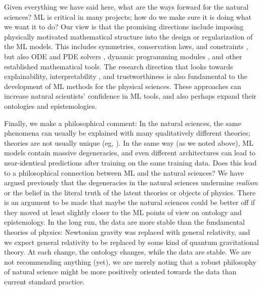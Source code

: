 \documentclass{article}
\begin{document}
Given everything we have said here, what are the ways forward for the natural sciences?
ML is critical in many projects; how do we make sure it is doing what we want it to do?
Our view is that the promising directions include imposing physically motivated mathematical structure into the design or regularization of the ML models.
This includes symmetries, conservation laws, and constraints \cite{bronstein2021geometric, villar2023towards}, but also ODE and PDE solvers \cite{karniadakis2021physics}, dynamic programming modules \cite{xu2020can}, and other established mathematical tools.
The research direction that looks towards explainability, interpretability \cite{interpretable}, and trustworthiness \cite{kearns2019ethical} is also fundamental to the development of ML methods for the physical sciences.
These approaches can increase natural scientists’ confidence in ML tools, and also perhaps expand their ontologies and epistemologies.

Finally, we make a philosophical comment:
In the natural sciences, the same phenomena can usually be explained with many qualitatively different theories; theories are not usually unique (eg, \citealt{hogg, peebles}).
In the same way (as we noted above), ML models contain massive degeneracies, and even different architectures can lead to near-identical predictions after training on the same training data.
Does this lead to a philosophical connection between ML and the natural sciences?
We have argued previously \cite{hogg} that the degeneracies in the natural sciences undermine \emph{realism} or the belief in the literal truth of the latent theories or objects of physics.
There is an argument to be made that maybe the natural sciences could be better off if they moved at least slightly closer to the ML points of view on ontology and epistemology.
In the long run, the data are more stable than the fundamental theories of physics:
Newtonian gravity was replaced with general relativity, and we expect general relativity to be replaced by some kind of quantum gravitational theory.
At each change, the ontology changes, while the data are stable.
We are not recommending anything (yet), we are merely noting that a robust philosophy of natural science might be more positively oriented towards the data than current standard practice.
\end{document}
